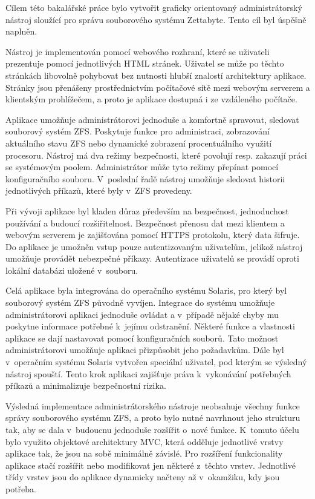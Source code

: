 Cílem této bakalářské práce bylo vytvořit graficky orientovaný administrátorský nástroj sloužící pro správu souborového systému Zettabyte. Tento cíl byl úspěšně naplněn.

Nástroj je implementován pomocí webového rozhraní, které se uživateli prezentuje pomocí jednotlivých HTML stránek. Uživatel se může po těchto stránkách libovolně pohybovat bez nutnosti hlubší znalostí architektury aplikace. Stránky jsou přenášeny prostřednictvím počítačové sítě mezi webovým serverem a klientským prohlížečem, a proto je aplikace dostupná i ze vzdáleného počítače.

Aplikace umožňuje administrátorovi jednoduše a komfortně spravovat, sledovat souborový systém ZFS. Poskytuje funkce pro administraci, zobrazování aktuálního stavu ZFS nebo dynamické zobrazení procentuálního využití procesoru. Nástroj má dva režimy bezpečnosti, které povolují resp. zakazují práci se systémovým poolem. Administrátor může tyto režimy přepínat pomocí konfiguračního souboru. V~poslední řadě nástroj umožňuje sledovat historii jednotlivých příkazů, které byly v~ZFS provedeny.

Při vývoji aplikace byl kladen důraz především na bezpečnost, jednoduchost používání a budoucí rozšiřitelnost. Bezpečnost přenosu dat mezi klientem a webovým serverem je zajišťována pomocí HTTPS protokolu, který data šifruje. Do aplikace je umožněn vstup pouze autentizovaným uživatelům, jelikož nástroj umožňuje provádět nebezpečné příkazy. Autentizace uživatelů se provádí oproti lokální databázi uložené v~souboru.

Celá aplikace byla integrována do operačního systému Solaris, pro který byl souborový systém ZFS původně vyvíjen. Integrace do systému umožňuje administrátorovi aplikaci jednoduše ovládat a v~případě nějaké chyby mu poskytne informace potřebné k~jejímu odstranění. Některé funkce a vlastnosti aplikace se dají nastavovat pomocí konfiguračních souborů. Tato možnost administrátorovi umožňuje aplikaci přizpůsobit jeho požadavkům. Dále byl v~operačním systému Solaris vytvořen speciální uživatel, pod kterým se výsledný nástroj spouští. Tento krok aplikaci zajišťuje práva k~vykonávání potřebných příkazů a minimalizuje bezpečnostní rizika.

Výsledná implementace administrátorského nástroje neobsahuje všechny funkce správy souborového systému ZFS, a proto bylo nutné navrhnout jeho strukturu tak, aby se dala v~budoucnu jednoduše rozšířit o~nové funkce. K~tomuto účelu bylo využito objektové architektury MVC, která odděluje jednotlivé vrstvy aplikace tak, že jsou na sobě minimálně závislé. Pro rozšíření funkcionality aplikace stačí rozšířit nebo modifikovat jen některé z~těchto vrstev. Jednotlivé třídy vrstev jsou do aplikace dynamicky načteny až v~okamžiku, kdy jsou potřeba.

